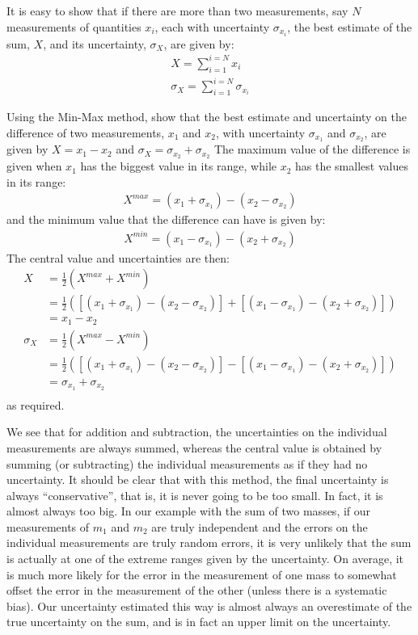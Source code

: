 It is easy to show that if there are more than two measurements, say $N$ measurements of quantities $x_i$, each with uncertainty $\sigma_{x_i}$, the best estimate of the sum, $X$, and its uncertainty, $\sigma_X$, are given by:
\begin{align}
X=\sum_{i=1}^{i=N}x_i\nonumber\\
\sigma_X=\sum_{i=1}^{i=N}\sigma_{x_i}
\end{align}

\begin{example}{}{Using the Min-Max method, show that the best estimate and uncertainty on the difference of two measurements, $x_1$ and $x_2$, with uncertainty $\sigma_{x_1}$ and $\sigma_{x_2}$, are given by $X=x_1-x_2$ and $\sigma_{X} =\sigma_{x_2} + \sigma_{x_2}$}{} 
The maximum value of the difference is given when $x_1$ has the biggest value in its range, while $x_2$ has the smallest values in its range:
\begin{align*}
X^{max}=(x_1+\sigma_{x_1})-(x_2-\sigma_{x_2})
\end{align*}
and the minimum value that the difference can have is given by:
\begin{align*}
X^{min}=(x_1-\sigma_{x_1})-(x_2+\sigma_{x_2})
\end{align*}
The central value and uncertainties are then:
\begin{align*}
X&=\frac{1}{2}(X^{max}+X^{min})\nonumber\\
 &=\frac{1}{2}\left(\left[(x_1+\sigma_{x_1})-(x_2-\sigma_{x_2})\right]+\left[(x_1-\sigma_{x_1})-(x_2+\sigma_{x_2})\right]\right)\nonumber\\
 &=x_1-x_2\nonumber\\
\sigma_{X} &=\frac{1}{2}(X^{max}-X^{min})\nonumber\\
 &=\frac{1}{2}\left(\left[(x_1+\sigma_{x_1})-(x_2-\sigma_{x_2})\right]-\left[(x_1-\sigma_{x_1})-(x_2+\sigma_{x_2})\right]\right)\nonumber\\
 &=\sigma_{x_1}+ \sigma_{x_2}\nonumber\\
\end{align*}
as required.
\end{example}
We see that for addition and subtraction, the uncertainties on the individual measurements are always summed, whereas the central value is obtained by summing (or subtracting) the individual measurements as if they had no uncertainty. It should be clear that with this method, the final uncertainty is always ``conservative'', that is, it is never going to be too small. In fact, it is almost always too big. In our example with the sum of two masses, if our measurements of $m_1$ and $m_2$ are truly independent and the errors on the individual measurements are truly random errors, it is very unlikely that the sum is actually at one of the extreme ranges given by the uncertainty. On average, it is much more likely for the error in the measurement of one mass to somewhat offset the error in the measurement of the other (unless there is a systematic bias). Our uncertainty estimated this way is almost always an overestimate of the true uncertainty on the sum, and is in fact an upper limit on the uncertainty. 
